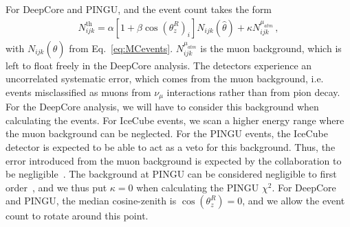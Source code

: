 \documentclass{revtex4-2}
\newcommand{\zreco}{\ensuremath{\cos{(\theta_z^{R})}}}
\newcommand{\nm}{\nu_\mu}
\begin{document}
For DeepCore and PINGU, and the event count takes the form
\begin{align}
    N^\text{th}_{ijk} = \alpha\left[1+\beta \zreco_i \right] N_{ijk}(\hat{\theta}) + \kappa N_{ijk}^{\mu_{atm}}\,,
\end{align}
with $N_{ijk}(\hat{\theta})$ from Eq.~\ref{eq:MCevents}. $N_{ijk}^{\mu_{atm}}$ is the muon background, which is left to float freely in the DeepCore analysis.
The detectors experience an uncorrelated systematic error, which comes from the muon background, 
i.e. events misclassified as muons from 
$\nm$ interactions rather than from pion decay. For the DeepCore analysis, we will have to consider this background when calculating the events.
For IceCube events, we scan a higher energy range where the muon background can be neglected. For the PINGU events, the IceCube detector is 
expected to be able to act as a veto for this background. Thus, the error introduced from the muon background is expected by the collaboration 
to be negligible~\cite{PINGUletter}.
The background at PINGU can be considered negligible to first order~\cite{PINGUdata}, and we thus put $\kappa=0$ when calculating the PINGU $\chi^2$.
For DeepCore and PINGU, the median cosine-zenith is $\zreco = 0$, and we allow the event count to rotate around this point.
\end{document}
